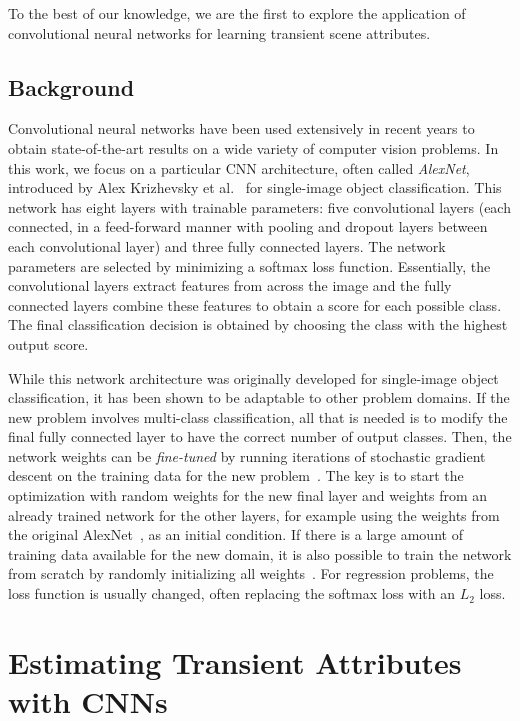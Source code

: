\documentclass[10pt,twocolumn,letterpaper]{article}
\begin{document}
To the best of our knowledge, we are the first to explore the application of
convolutional neural networks for learning transient scene attributes.

\subsection{Background}

Convolutional neural networks have been used extensively in recent
years to obtain state-of-the-art results on a wide variety of computer vision
problems.  In this work, we focus on a particular CNN architecture, often
called {\em AlexNet}, introduced by Alex Krizhevsky et al.~\cite{caffenetnips12}
for single-image object classification. This network has eight layers with
trainable parameters: five convolutional layers (each connected, in a
feed-forward manner with pooling and dropout layers between each convolutional
layer) and three fully connected layers. The network parameters are selected by minimizing a
softmax loss function. Essentially, the convolutional layers
extract features from across the image and the fully connected layers combine
these features to obtain a score for each possible class. The final
classification decision is obtained by choosing the class with the highest
output score.  

While this network architecture was originally developed for single-image
object classification, it has been shown to be adaptable to other problem
domains. If the new problem involves multi-class classification, all that is
needed is to modify the final fully connected layer to have the correct number
of output classes. Then, the network weights can be {\em fine-tuned} by running
iterations of stochastic gradient descent on the training data for the new
problem~\cite{yosinski2014transferable}.  The key is to start the optimization
with random weights for the new final layer and weights from an already trained
network for the other layers, for example using the weights from the original
AlexNet~\cite{caffenetnips12}, as an initial condition. If there is a large
amount of training data available for the new domain, it is also possible to
train the network from scratch by randomly initializing all
weights~\cite{zhou2014places}.  For regression problems, the loss
function is usually changed, often replacing the softmax loss with an
$L_2$ loss.

\section{Estimating Transient Attributes with CNNs}
\label{sec:method}
\end{document}
